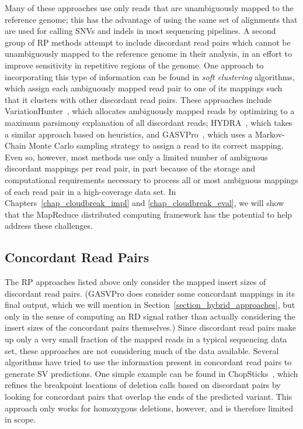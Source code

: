 Many of these approaches use only reads that are unambiguously mapped to the reference genome; this has the advantage of using the same set of alignments that are used for calling SNVs and indels in most sequencing pipelines. A second group of RP methods attempt to include discordant read pairs which cannot be unambiguously mapped to the reference genome in their analysis, in an effort to improve sensitivity in repetitive regions of the genome. One approach to incorporating this type of information can be found in \emph{soft clustering} algorithms, which assign each ambiguously mapped read pair to one of its mappings such that it clusters with other discordant read pairs. These approaches include VariationHunter~\cite{Hormozdiari:2009p284}, which allocates ambiguously mapped reads by optimizing to a maximum parsimony explanation of all discordant reads; HYDRA~\cite{Quinlan:2010gf}, which takes a similar approach based on heuristics, and GASVPro~\cite{Sindi:2012kk}, which uses a Markov-Chain Monte Carlo sampling strategy to assign a read to its correct mapping. Even so, however, most methods use only a limited number of ambiguous discordant mappings per read pair, in part because of the storage and computational requirements necessary to process all or most ambiguous mappings of each read pair in a high-coverage data set. In Chapters~\ref{chap_cloudbreak_impl} and \ref{chap_cloudbreak_eval}, we will show that the MapReduce distributed computing framework has the potential to help address these challenges.

\subsection{Concordant Read Pairs}\label{section_mixture_of_distributions}

The RP approaches listed above only consider the mapped insert sizes of discordant read pairs. (GASVPro does consider some concordant mappings in its final output, which we will mention in Section~\ref{section_hybrid_approaches}, but only in the sense of computing an RD signal rather than actually considering the insert sizes of the concordant pairs themselves.) Since discordant read pairs make up only a very small fraction of the mapped reads in a typical sequencing data set, these approaches are not considering much of the data available. Several algorithms have tried to use the information present in concordant read pairs to generate SV predictions. One simple example can be found in ChopSticks~\cite{Yasuda:2012ij}, which refines the breakpoint locations of deletion calls based on discordant pairs by looking for concordant pairs that overlap the ends of the predicted variant. This approach only works for homozygous deletions, however, and is therefore limited in scope.

